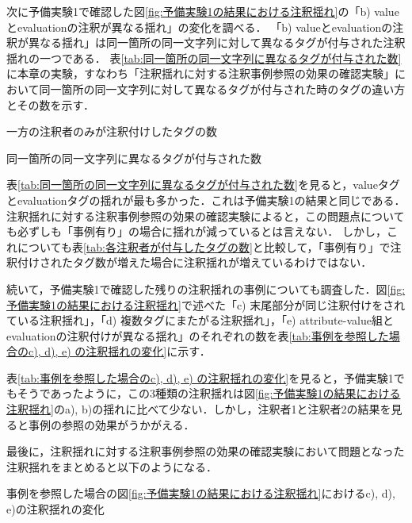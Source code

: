 \documentclass[japanese]{jnlp_1.4}
\begin{document}
次に予備実験1で確認した図\ref{fig:予備実験1の結果における注釈揺れ}の「b) valueとevaluationの注釈が異なる揺れ」の変化を調べる．
「b) valueとevaluationの注釈が異なる揺れ」は同一箇所の同一文字列に対して異なるタグが付与された注釈揺れの一つである．
表\ref{tab:同一箇所の同一文字列に異なるタグが付与された数}に本章の実験，すなわち「注釈揺れに対する注釈事例参照の効果の確認実験」において同一箇所の同一文字列に対して異なるタグが付与された時のタグの違い方とその数を示す．

\begin{table}[t]
\caption{一方の注釈者のみが注釈付けしたタグの数}
\label{tab:一方の注釈者のみが注釈付けしたタグの数}

\end{table}
\begin{table}[t]
\caption{同一箇所の同一文字列に異なるタグが付与された数}
\label{tab:同一箇所の同一文字列に異なるタグが付与された数}

\end{table}

表\ref{tab:同一箇所の同一文字列に異なるタグが付与された数}を見ると，valueタグとevaluationタグの揺れが最も多かった．これは予備実験1の結果と同じである．注釈揺れに対する注釈事例参照の効果の確認実験によると，この問題点についても必ずしも「事例有り」の場合に揺れが減っているとは言えない．
しかし，これについても表\ref{tab:各注釈者が付与したタグの数}と比較して，「事例有り」で注釈付けされたタグ数が増えた場合に注釈揺れが増えているわけではない．

続いて，予備実験1で確認した残りの注釈揺れの事例についても調査した．図\ref{fig:予備実験1の結果における注釈揺れ}で述べた「c) 末尾部分が同じ注釈付けをされている注釈揺れ」，「d) 複数タグにまたがる注釈揺れ」，「e) attribute-value組とevaluationの注釈付けが異なる揺れ」のそれぞれの数を表\ref{tab:事例を参照した場合のc), d), e) の注釈揺れの変化}に示す．

表\ref{tab:事例を参照した場合のc), d), e) の注釈揺れの変化}を見ると，予備実験1でもそうであったように，この3種類の注釈揺れは図\ref{fig:予備実験1の結果における注釈揺れ}のa), b)の揺れに比べて少ない．しかし，注釈者1と注釈者2の結果を見ると事例の参照の効果がうかがえる．

最後に，注釈揺れに対する注釈事例参照の効果の確認実験において問題となった注釈揺れをまとめると以下のようになる．

\begin{table}[t]
\caption{事例を参照した場合の図\ref{fig:予備実験1の結果における注釈揺れ}におけるc), d), e)の注釈揺れの変化}
\label{tab:事例を参照した場合のc), d), e) の注釈揺れの変化}

\end{table}
\end{document}
